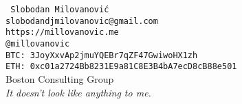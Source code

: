 \documentclass{UUThesisTemplate}
\begin{document}
\par
{\color{white}\texttt{
Slobodan Milovanović\\
slobodandjmilovanovic@gmail.com\\
https://millovanovic.me\\
@millovanovic\\
BTC: 3JoyXxvAp2jmuYQEBr7qZF47GwiwoHX1zh\\
ETH: 0xc01a2724Bb8231E9a81C8E3B4bA7ecD8cB88e501\\}
Boston Consulting Group\\
\emph{It doesn't look like anything to me.}
}








\end{document}
